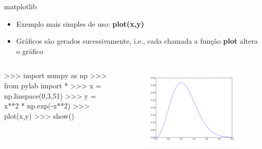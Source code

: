 \documentclass[12pt,t,graphics]{beamer}
\begin{document}
\begin{frame}[t,fragile]{matplotlib}
	\begin{itemize}
		\item Exemplo mais simples de uso: \textbf{plot(x,y)}
		\item Gráficos são gerados sucessivamente, i.e., cada chamada a função
		\textbf{plot} altera o gráfico
	\end{itemize}
	\begin{columns}
		\begin{python}
>>> import numpy as np
>>> from pylab import *
>>> x = np.linspace(0,3,51)
>>> y = x**2 * np.exp(-x**2)
>>> plot(x,y)
>>> show()
		\end{python}
		\begin{figure}
			\centering
			\includegraphics[scale=0.265]{img/plot1.png}
		\end{figure}
	\end{columns}
\end{frame}
\end{document}
